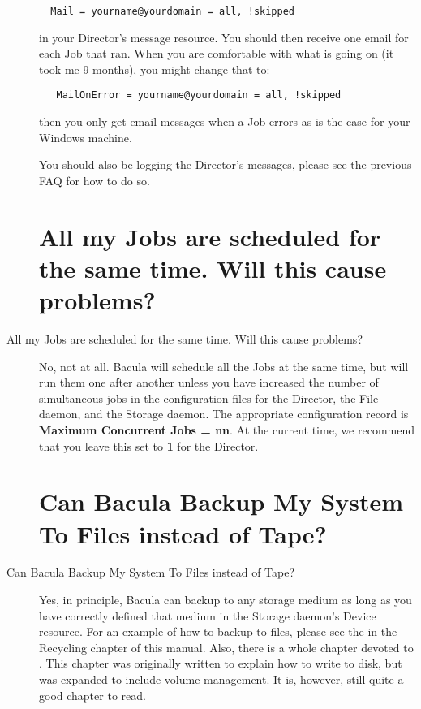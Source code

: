 \begin{description}
\footnotesize
\begin{verbatim}
  Mail = yourname@yourdomain = all, !skipped

\end{verbatim}
\normalsize

in your Director's message resource.  You should then receive one email for
each Job that ran.  When you are comfortable with what is going on (it took
me 9 months), you might change that to:

\footnotesize
\begin{verbatim}
   MailOnError = yourname@yourdomain = all, !skipped

\end{verbatim}
\normalsize

then you only get email messages when a Job errors as is the case  for your
Windows machine.

You should also be logging the Director's messages, please see the  previous
FAQ for how to do so.

\label{sched}
\section{All my Jobs are scheduled for the same time. Will this cause
   problems?}
\item [All my Jobs are scheduled for the same time. Will this cause
   problems? ]
   No, not at all.  Bacula will schedule all the Jobs at the same time, but
   will run them one after another unless you have increased the number of
   simultaneous jobs in the configuration files for the Director, the File
   daemon, and the Storage daemon.  The appropriate configuration record is
   {\bf Maximum Concurrent Jobs = nn}.  At the current time, we recommend
   that you leave this set to {\bf 1} for the Director.

\label{disk}
\section{Can Bacula Backup My System To Files instead of Tape?}
\item [Can Bacula Backup My System To Files instead of Tape? ]
   Yes, in principle, Bacula can backup to any storage medium as long as
   you have correctly defined that medium in the Storage daemon's Device
   resource.  For an example of how to backup to files, please see the
    in the Recycling chapter of this
   manual.  Also, there is a whole chapter devoted to .  This chapter was originally written to
   explain how to write to disk, but was expanded to include volume
   management.  It is, however, still quite a good chapter to read.


\end{description}
